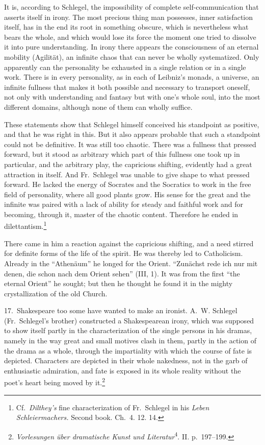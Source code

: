 \documentclass[12pt]{book}
\newcommand{\opage}[1]{\marginnote{\footnotesize\textit{[#1]}}}
\begin{document}
It is, according to Schlegel, the impossibility of complete self-communication that
asserts itself in irony. The most precious thing man possesses, inner satisfaction
itself, has in the end its root in something obscure, which is nevertheless what
bears the whole, and which would lose its force the moment one tried to dissolve it
into pure understanding. In irony there appears the consciousness of an eternal
mobility (Agilität), an infinite chaos that can never be wholly systematized. Only
apparently can the personality be exhausted in a single relation or in a single
work. There is in every personality, as in each of Leibniz's monads, a universe, an
infinite fullness that makes it both possible and necessary to transport oneself,
not only with understanding and fantasy but with one's whole soul, into the most
different domains, although none of them can wholly suffice.

These statements show that Schlegel himself conceived his standpoint as positive, and
that he was right in this. But it also appears probable that such a standpoint could
not be definitive. It was still too chaotic. There was a fullness that pressed
forward, but it stood as arbitrary which part of this fullness one took up in
particular, and the arbitrary play, the capricious shifting, evidently had a great
attraction in itself. And Fr.~Schlegel was unable to give shape to what pressed
forward. He lacked the energy of Socrates and the Socratics to work in the free field
of personality, where all good plants grow. His sense for the great and the infinite
was paired with a lack of ability for steady and faithful work and for becoming,
through it, master of the chaotic content. Therefore he ended in
dilettantism.\footnote{Cf.\ \textit{Dilthey's} fine characterization of Fr.~Schlegel
in his \textit{Leben Schleiermachers.} Second book. Ch.~4. 12. 14.} %

There came in him a reaction against the capricious shifting, and a need stirred for
definite forms of the life of the spirit. He was thereby led to Catholicism. Already
in the ``Athenäum'' \opage{67}he longed for the Orient. ``Zunächst rede ich nur mit
denen, die schon nach dem Orient sehen'' (III, 1). It was from the first ``the
eternal Orient'' he sought; but then he thought he found it in the mighty
crystallization of the old Church.

17.~Shakespeare too some have wanted to make an ironist. A.~W. Schlegel
(Fr.~Schlegel's brother) constructed a Shakespearean irony, which was supposed to
show itself partly in the characterization of the single persons in his dramas,
namely in the way great and small motives clash in them, partly in the action of the
drama as a whole, through the impartiality with which the course of fate is
depicted. Characters are depicted in their whole nakedness, not in the garb of
enthusiastic admiration, and fate is exposed in its whole reality without the poet's
heart being moved by it.\footnote{\textit{Vorlesungen über dramatische Kunst und
Literatur}\textsuperscript{4}. II. p.~197--199.}
\end{document}
